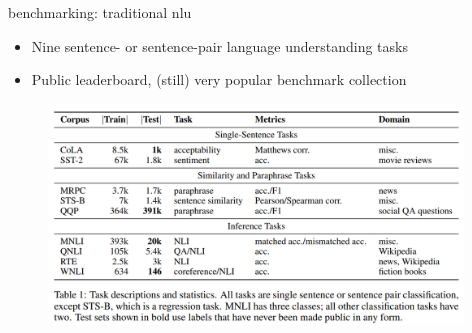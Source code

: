 
\begin{vbframe}{benchmarking: traditional nlu}

\vfill

\begin{itemize}
	\item Nine sentence- or sentence-pair language understanding tasks
	\item Public leaderboard, (still) very popular benchmark collection
\end{itemize}

	\begin{figure}
		\centering
		\includegraphics[width = 11cm]{figure/glue.png}\\ 
	\end{figure}

\vfill

\end{vbframe}


